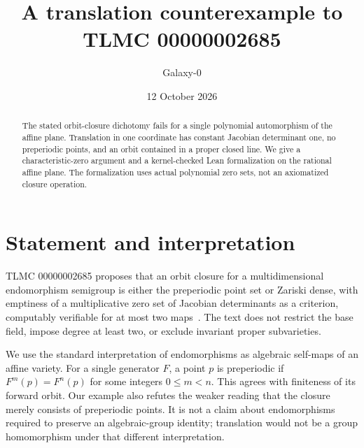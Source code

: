 \documentclass[11pt]{article}
\title{A translation counterexample to TLMC 00000002685}
\author{Galaxy-0}
\date{12 October 2026}
\begin{document}
\maketitle
\begin{abstract}
The stated orbit-closure dichotomy fails for a single polynomial automorphism
of the affine plane. Translation in one coordinate has constant Jacobian
determinant one, no preperiodic points, and an orbit contained in a proper
closed line. We give a characteristic-zero argument and a kernel-checked
Lean formalization on the rational affine plane. The formalization uses
actual polynomial zero sets, not an axiomatized closure operation.
\end{abstract}

\section{Statement and interpretation}
TLMC 00000002685 proposes that an orbit closure for a multidimensional
endomorphism semigroup is either the preperiodic point set or Zariski dense,
with emptiness of a multiplicative zero set of Jacobian determinants as a
criterion, computably verifiable for at most two maps~\cite{tlmc}.
The text does not restrict the base field, impose degree at least two,
or exclude invariant proper subvarieties.

We use the standard interpretation of endomorphisms as algebraic self-maps
of an affine variety. For a single generator $F$, a point $p$ is preperiodic
if $F^m(p)=F^n(p)$ for some integers $0\leq m<n$. This agrees with finiteness
of its forward orbit. Our example also refutes the weaker reading that the
closure merely consists of preperiodic points. It is not a claim about
endomorphisms required to preserve an algebraic-group identity; translation
would not be a group homomorphism under that different interpretation.
\end{document}
